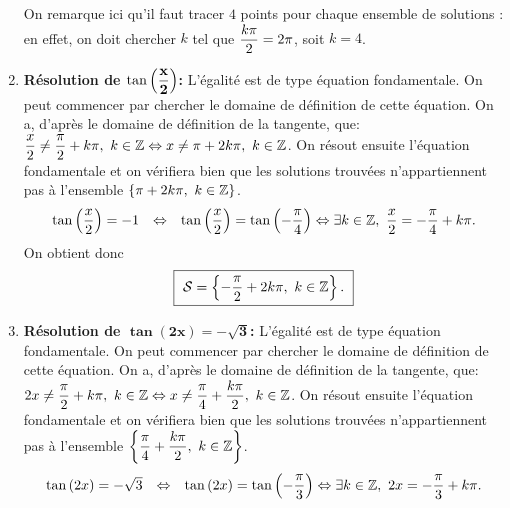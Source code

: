 \documentclass[a4paper, 11pt]{article}
\begin{document}
\begin{correction}
\begin{enumerate}
On remarque ici qu'il faut tracer $4$ points pour chaque ensemble de solutions : en effet, on doit chercher $k$ tel que $\displaystyle \frac{k \pi}{2} = 2 \pi$, soit $k=4$.
\item \textbf{R\'esolution de $\mathbf{\tan{\left(\displaystyle\frac{x}{2}\right)}}$:}
L'\'egalit\'e est de type \'equation fondamentale. On peut commencer par chercher le domaine de d\'efinition de cette \'equation. On a, d'apr\`{e}s le domaine de d\'efinition de la tangente, que: $\displaystyle\frac{x}{2}\not= \displaystyle\frac{\pi}{2}+k\pi,\ k\in\mathbb{Z}\Leftrightarrow x\not= \pi+2k\pi,\ k\in\mathbb{Z}$. On r\'esout ensuite l'\'equation fondamentale et on v\'erifiera bien que les solutions trouv\'ees n'appartiennent pas \`{a} l'ensemble $\left\lbrace  \pi+2k\pi,\ k\in\mathbb{Z} \right\rbrace$. 
$$\begin{array}{lll}
\tan{\left(\displaystyle\frac{x}{2}\right)}=-1 &\Leftrightarrow & \tan{\left(\displaystyle\frac{x}{2}\right)}= \tan{\left(-\displaystyle\frac{\pi}{4}\right)}
\Leftrightarrow  \exists k\in\mathbb{Z},\ \displaystyle\frac{x}{2}=-\displaystyle\frac{\pi}{4}+k\pi.\\
\end{array}$$
On obtient donc
\begin{equation*}
\fbox{
$\mathcal{S}=\left\lbrace -\displaystyle\frac{\pi}{2}+2k\pi,\ k\in\mathbb{Z}\right\rbrace.$
}
\end{equation*}
\item \textbf{R\'esolution de $\mathbf{ \tan{(2x)}=-\sqrt{3}}$:}
L'\'egalit\'e est de type \'equation fondamentale.
On peut commencer par chercher le domaine de d\'efinition de cette \'equation. On a, d'apr\`{e}s le domaine de d\'efinition de la tangente, que: $2x\not= \displaystyle\frac{\pi}{2}+k\pi,\ k\in\mathbb{Z}\Leftrightarrow x\not= \displaystyle\frac{\pi}{4}+\displaystyle\frac{k\pi}{2} ,\ k\in\mathbb{Z}$. On r\'esout ensuite l'\'equation fondamentale et on v\'erifiera bien que les solutions trouv\'ees n'appartiennent pas \`{a} l'ensemble $\left\lbrace \displaystyle\frac{\pi}{4}+\displaystyle\frac{k\pi}{2},\ k\in\mathbb{Z} \right\rbrace$. 
$$\begin{array}{lll}
\tan{(2x)}=-\sqrt{3} &\Leftrightarrow & \tan{(2x)}= \tan{\left(-\displaystyle\frac{\pi}{3}\right)}
\Leftrightarrow  \exists k\in\mathbb{Z},\ 2x=-\displaystyle\frac{\pi}{3}+k\pi.
\end{array}$$
\begin{minipage}[c]{0.45\linewidth}

\end{minipage}
\end{enumerate}
\end{correction}
\end{document}
